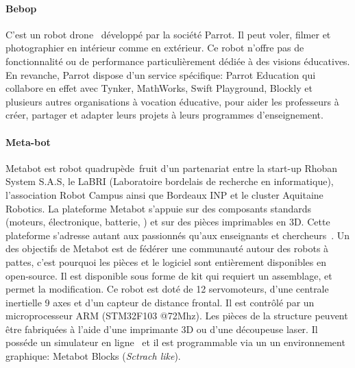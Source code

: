         \paragraph{Bebop}\label{sec:Bebop}\nocite{krajnik2011ar}
            C'est un robot drone~ développé par la société Parrot. Il peut voler, filmer et photographier en intérieur comme en extérieur. Ce robot n'offre pas de fonctionnalité ou de performance particulièrement dédiée à des visions éducatives. En revanche, Parrot dispose d'un service spécifique: Parrot Education qui collabore en effet avec Tynker, MathWorks, Swift Playground, Blockly et plusieurs autres organisations à vocation éducative, pour aider les professeurs à créer, partager et adapter leurs projets à leurs programmes d’enseignement.
        \paragraph{Meta-bot}\label{sec:Metabot}
            Metabot est robot quadrupède~fruit d’un partenariat entre la start-up Rhoban System S.A.S, le LaBRI (Laboratoire bordelais de recherche en informatique), l’association Robot Campus ainsi que Bordeaux INP et le cluster Aquitaine Robotics.
            La plateforme Metabot s’appuie sur des composants standards (moteurs, électronique, batterie, \etc) et sur des pièces imprimables en 3D. Cette plateforme s’adresse autant aux passionnés qu’aux enseignants et chercheurs~. Un des objectifs de Metabot est de fédérer une communauté autour des robots à pattes, c’est pourquoi les pièces et le logiciel sont entièrement disponibles en open-source. Il est disponible sous forme de kit qui requiert un assemblage, et permet la modification. Ce robot est doté de 12 servomoteurs, d’une centrale inertielle 9 axes et d’un capteur de distance frontal. Il est contrôlé par un microprocesseur ARM (STM32F103 @72Mhz). Les pièces de la structure peuvent être fabriquées à l’aide d’une imprimante 3D ou d’une découpeuse laser.
            Il posséde un simulateur en ligne~ et il est programmable via un un environnement graphique: Metabot Blocks (\textit{Sctrach like}).